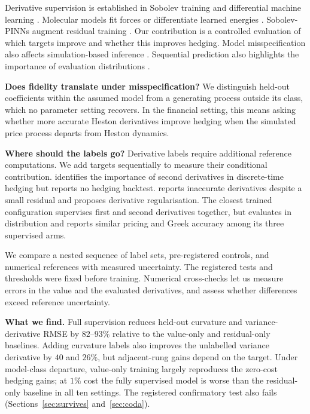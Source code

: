 \documentclass{article}
\begin{document}
Derivative supervision is established in Sobolev training
\citep{czarnecki2017sobolev} and differential machine learning
\citep{huge2020differential}. Molecular models fit forces
\citep{ercolessi1994force,wang2019machine} or differentiate learned energies
\citep{behler2007generalized}. Sobolev-PINNs augment residual training
\citep{son2021sobolev}. Our contribution is a controlled evaluation of which
targets improve and whether this improves hedging. Model misspecification also
affects simulation-based inference \citep{cranmer2020frontier,cannon2022investigating}.
Sequential prediction also highlights the importance of evaluation distributions
\citep{ross2011reduction}.

\textbf{Does fidelity translate under misspecification?} We distinguish held-out
coefficients within the assumed model from a generating process outside its class,
which no parameter setting recovers. In the financial setting, this means asking
whether more accurate Heston derivatives improve hedging when the simulated price
process departs from Heston dynamics.

\textbf{Where should the labels go?} Derivative labels require additional reference
computations. We add targets sequentially to measure their conditional contribution.
\citet{noguer2026derivative} identifies the
importance of second derivatives in discrete-time hedging but reports no hedging
backtest. \citet{malandain2025deepsvm} reports inaccurate derivatives
despite a small residual and proposes derivative regularisation. The closest trained
configuration \citep{sakuma2026a} supervises first and second derivatives together,
but evaluates in distribution and reports similar pricing and Greek accuracy
among its three supervised arms.

We compare a nested sequence of label sets, pre-registered controls, and numerical
references with measured uncertainty. The registered tests and thresholds were fixed
before training. Numerical cross-checks let us measure errors in the value and the
evaluated derivatives, and assess whether differences exceed reference uncertainty.

\textbf{What we find.} Full supervision reduces held-out curvature and
variance-derivative RMSE by $82$--$93\%$ relative to the value-only and residual-only
baselines. Adding curvature labels also improves the
unlabelled variance derivative by $40$ and $26\%$, but adjacent-rung gains depend on
the target. Under model-class departure, value-only training largely reproduces
the zero-cost hedging gains; at $1\%$ cost the fully supervised model is worse than
the residual-only baseline in all ten settings. The registered confirmatory test
also fails (Sections~\ref{sec:survives} and~\ref{sec:coda}).
\end{document}
